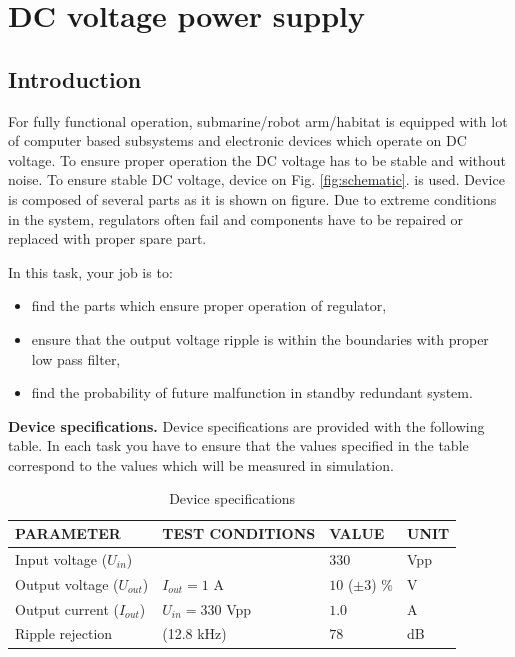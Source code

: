 \documentclass[a4paper]{article}
\begin{document}
\section{DC voltage power supply}

\subsection{Introduction}

For fully functional operation, submarine/robot arm/habitat is equipped with 
lot of computer based subsystems and electronic devices which operate on DC 
voltage. To ensure proper operation the DC voltage has to be stable and without 
noise. To ensure stable DC voltage, device on Fig. \ref{fig:schematic}. is used. 
Device is composed of several parts as it is shown on figure. Due to extreme 
conditions in the system, regulators often fail and components have to be 
repaired or replaced with proper spare part.

In this task, your job is to:
\begin{itemize}
\item find the parts which ensure proper operation of regulator, 
\item ensure that the output voltage ripple is within the boundaries with 
proper low pass filter,
\item find the probability of future malfunction in standby redundant system.
\end{itemize}

\textbf{Device specifications.} Device specifications are provided with 
the following table. In each task you have to ensure that the values specified
in the table correspond to the values which will be measured in simulation. 

\begin{table}[h!]
    \caption{Device specifications}
    \label{tab:spec}
    \begin{tabularx}{\linewidth}{|X|X|X|X|} \hline
    PARAMETER & TEST CONDITIONS & VALUE & UNIT \\ \hline
    Input voltage ($U_{in}$)&  & $330$ & Vpp \\ \hline 
    Output voltage ($U_{out}$)& $I_{out} = 1$ A & $10$ ($\pm3$) \% & V \\ \hline
    Output current ($I_{out}$) & $U_{in} = 330$ Vpp & $1.0$ & A \\ \hline
    Ripple rejection & (12.8 kHz) & $78$ & dB \\ \hline
    \end{tabularx}
\end{table}
\end{document}
